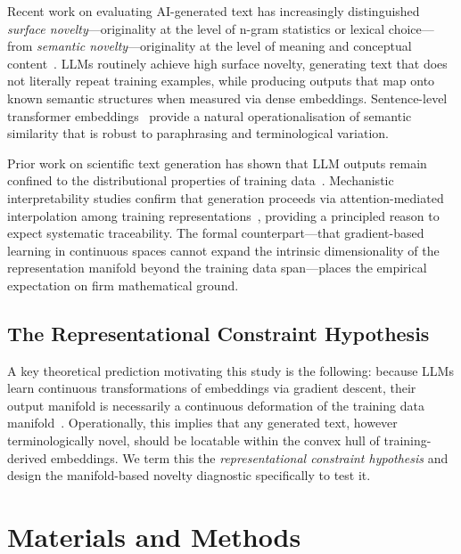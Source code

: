 \documentclass[pdflatex,sn-mathphys-num]{sn-jnl}
\begin{document}
Recent work on evaluating AI-generated text has increasingly distinguished
\emph{surface novelty}---originality at the level of n-gram statistics or
lexical choice---from \emph{semantic novelty}---originality at the level of
meaning and conceptual content~\cite{organisciak2023beyond,stevenson2022gpt,padmakumar2025measuring,lin2024novelty}.
LLMs routinely achieve high surface novelty, generating text that does not
literally repeat training examples, while producing outputs that map onto known
semantic structures when measured via dense embeddings.  Sentence-level
transformer embeddings~\cite{reimers2019sentencebert} provide a natural
operationalisation of semantic similarity that is robust to paraphrasing and
terminological variation.

Prior work on scientific text generation has shown that LLM outputs remain
confined to the distributional properties of training
data~\cite{brown2020language,vaswani2017attention}.  Mechanistic interpretability
studies confirm that generation proceeds via attention-mediated interpolation
among training
representations~\cite{elhage2021mathematical}, providing a principled reason
to expect systematic traceability.  The formal counterpart---that gradient-based
learning in continuous spaces cannot expand the intrinsic dimensionality of the
representation manifold beyond the training data span---places the empirical
expectation on firm mathematical ground.

\subsection{The Representational Constraint Hypothesis}

A key theoretical prediction motivating this study is the following: because
LLMs learn continuous transformations of embeddings via gradient descent, their
output manifold is necessarily a continuous deformation of the training data
manifold~\cite{tu2026prism}.  Operationally, this implies that any generated text, however
terminologically novel, should be locatable within the convex hull of training-
derived embeddings.  We term this the \emph{representational constraint
hypothesis} and design the manifold-based novelty diagnostic specifically to
test it.

\section{Materials and Methods}
\label{sec:methods}
\end{document}
